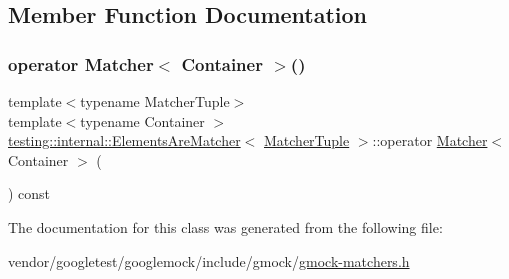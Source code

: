 \subsection{Member Function Documentation}
\mbox{\label{classtesting_1_1internal_1_1_elements_are_matcher_a6e6eaf8918c5d581b4b62ece23559be9}} 
\subsubsection{\texorpdfstring{operator Matcher$<$ Container $>$()}{operator Matcher< Container >()}}
{\footnotesize\ttfamily template$<$typename Matcher\+Tuple$>$ \\
template$<$typename Container $>$ \\
\hyperlink{classtesting_1_1internal_1_1_elements_are_matcher}{testing\+::internal\+::\+Elements\+Are\+Matcher}$<$ \hyperlink{structtesting_1_1internal_1_1_matcher_tuple}{Matcher\+Tuple} $>$\+::operator \hyperlink{classtesting_1_1_matcher}{Matcher}$<$ Container $>$ (\begin{DoxyParamCaption}{ }\end{DoxyParamCaption}) const\hspace{0.3cm}{\ttfamily [inline]}}



The documentation for this class was generated from the following file\+:\begin{DoxyCompactItemize}
\item 
vendor/googletest/googlemock/include/gmock/\hyperlink{gmock-matchers_8h}{gmock-\/matchers.\+h}\end{DoxyCompactItemize}
